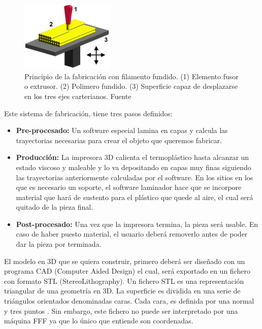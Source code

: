 \begin{figure}[H]
    \centering
    \includegraphics[width=0.4\textwidth]{images/FDM_by_Zureks.png}
    \caption[Principio de la fabricación con filamento fundido]{Principio de la fabricación con filamento fundido. (1) Elemento fusor o extrusor. (2) Polimero fundido. (3) Superficie capaz de desplazarse en los tres ejes carterianos. Fuente \cite{fundamentoFDM}}
    \label{fig:impr_fdm}
\end{figure}

Este sistema de fabricación, tiene tres pasos definidos:

\begin{itemize}
    \item \textbf{Pre-procesado:} Un software especial lamina en capas y calcula las trayectorias necesarias para crear el objeto que queremos fabricar.
    \item \textbf{Producción:} La impresora 3D calienta el termoplástico hasta alcanzar un estado viscoso y maleable y lo va depositando en capas muy finas siguiendo las trayectorias anteriormente calculadas por el software. En los sitios en los que es necesario un soporte, el software laminador hace que se incorpore material que hará de sustento para el plástico que quede al aire, el cual será quitado de la pieza final.
    \item \textbf{Post-procesado:} Una vez que la impresora termina, la pieza será usable. En caso de haber puesto material, el usuario deberá removerlo antes de poder dar la pieza por terminada.
\end{itemize}

El modelo en 3D que se quiera construir, primero deberá ser diseñado con un programa CAD (Computer Aided Design) el cual, será exportado en un fichero con formato STL (StereoLithography). Un fichero STL es una representación triangular de una geometría en 3D. La superficie es dividida en una serie de triángulos orientados denominadas caras. Cada cara, es definida por una normal y tres puntos \cite{stl}. Sin embargo, este fichero no puede ser interpretado por una máquina FFF ya que lo único que entiende son coordenadas.\\


